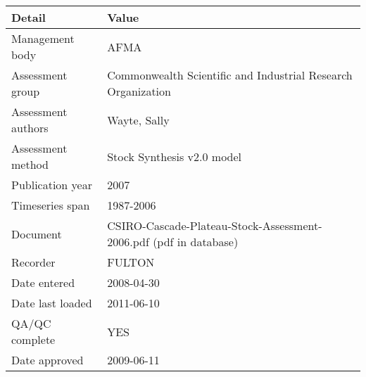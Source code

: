 \begin{table}[htb]
\centering
\begin{tabular}{lp{7cm}}
\toprule
Detail & Value \\
\midrule
Management body    & AFMA                                                              \\
Assessment group   & Commonwealth Scientific and Industrial Research Organization      \\
Assessment authors & Wayte, Sally                                                      \\
Assessment method  & Stock Synthesis v2.0 model                                        \\
Publication year   & 2007                                                              \\
Timeseries span    & 1987-2006                                                         \\
Document           & CSIRO-Cascade-Plateau-Stock-Assessment-2006.pdf (pdf in database) \\
Recorder           & FULTON                                                            \\
Date entered       & 2008-04-30                                                        \\
Date last loaded   & 2011-06-10                                                        \\
QA/QC complete     & YES                                                               \\
Date approved      & 2009-06-11                                                        \\
\bottomrule
\end{tabular}
\label{tab:assessdet}
\end{table}
